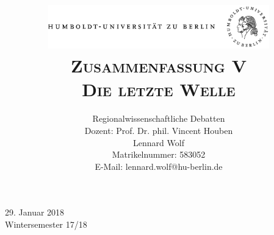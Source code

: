 \documentclass[a4paper, 12pt]{article}
\date{\vspace{-3ex}}
\begin{document}
\title{\vspace{5ex}
	\includegraphics*[bb=0 0 720 200, width=0.72\textwidth]{ErstesSem/images/hu_logo.png}\\
	\vspace{30pt}
	\scshape\LARGE{Zusammenfassung V}\\\Large{Die letzte Welle}\vspace{20pt}}
	


\author{Regionalwissenschaftliche Debatten\\
	\vspace{7pt}
          Dozent: Prof. Dr. phil. Vincent Houben\\\vspace{4pt}Lennard Wolf\\
        \small{Matrikelnummer: 583052}\\
        \small{E-Mail: lennard.wolf@hu-berlin.de}}


\maketitle

\vspace{\fill}

\begin{minipage}[]{0.92\textwidth}
    \centering
    \onehalfspacing
    \large   
    29. Januar 2018\\
    Wintersemester 17/18

    \vspace{-20mm} 
\end{minipage}%
\thispagestyle{empty}
\newpage
\setcounter{page}{1}
\end{document}
